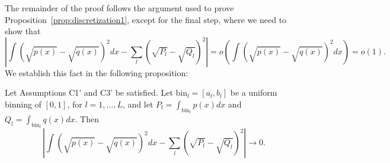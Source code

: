 \documentclass{article}
\newcommand{\bin}{\text{bin}}
\begin{document}

The remainder of the proof follows the argument used to prove Proposition~\ref{prop:discretization1}, except for the final step, where we need to show that
$$\left| \int (\sqrt{p(x)} - \sqrt{q(x)})^2 dx - \sum_l (\sqrt{P_l} - \sqrt{Q_l})^2 \right| = o(\int (\sqrt{p(x)} - \sqrt{q(x)})^2 dx) = o(1).$$
We establish this fact in the following proposition:



\begin{proposition}
\label{prop:H_HL_convergence2}
Let Assumptions C1' and C3' be satisfied. Let $\bin_l = [a_l, b_l]$ be a uniform binning of $[0,1]$, for $l=1, \dots, L$, and let $P_l = \int_{\bin_l} p(x) dx$ and $Q_l = \int_{\bin_l} q(x) dx$. Then
\[
\left| \int (\sqrt{p(x)} - \sqrt{q(x)})^2 dx - \sum_l (\sqrt{P_l} - \sqrt{Q_l})^2 \right| \rightarrow 0.
\]
\end{proposition}
\end{document}
